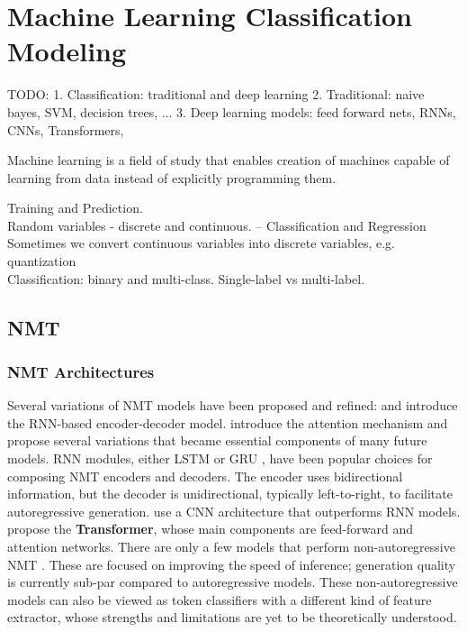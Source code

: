 \chapter{Machine Learning Classification Modeling}

TODO:
1. Classification: traditional and deep learning
2. Traditional: naive bayes, SVM, decision trees, ...
3. Deep learning models: feed forward nets, RNNs, CNNs, Transformers, 


Machine learning is a field of study that enables creation of machines capable of learning from data instead of explicitly programming them.

Training and Prediction. \\ 
Random variables - discrete and continuous. -- Classification and Regression \\
Sometimes we convert continuous variables into discrete variables, e.g. quantization \\

Classification: binary and multi-class.  Single-label vs multi-label.



\section{NMT}
\subsection{NMT Architectures}
\label{sec:rel-nmt-arch}
Several variations of NMT models have been proposed and refined: \citet{sutskever2014seq2seq} and \citet{cho2014learning} introduce the RNN-based encoder-decoder model. 
\citet{bahdanau2014nmtattn} introduce the attention mechanism and \citet{luong2015effectiveAttn} propose several variations that became essential components of many future models.
RNN modules, either LSTM \cite{hochreiter1997LSTM} or GRU \cite{cho-etal-2014-properties}, have been popular choices for composing NMT encoders and decoders. 
The encoder uses bidirectional information, but the decoder is unidirectional, typically left-to-right, to facilitate autoregressive generation.
\citet{gehring2017CNNMT} use a CNN architecture that outperforms RNN models.
\citet{vaswani2017attention} propose the \textbf{Transformer}, whose main components are feed-forward and attention networks. 
There are only a few models that perform non-autoregressive NMT \cite{libovicky-helcl-2018-end,Gu-etal-17-NonAR-NMT}.
These are focused on improving the speed of inference; generation quality is currently sub-par compared to autoregressive models.
These non-autoregressive models can also be viewed as token classifiers with a different kind of feature extractor, whose strengths and limitations are yet to be theoretically understood.